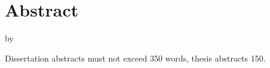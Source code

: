 \chapter*{Abstract}{
\pagestyle{plain} %

\begin{center}
    \Large{\bfseries{\thesistitle}}
    
    by
    
    \bfseries\MakeUppercase{\authorname}
\end{center}


Dissertation abstracts must not exceed 350 words, thesis abstracts
150\cite{cwru_grad_studies}.

\lipsum[1]



\thispagestyle{plain} %
}
